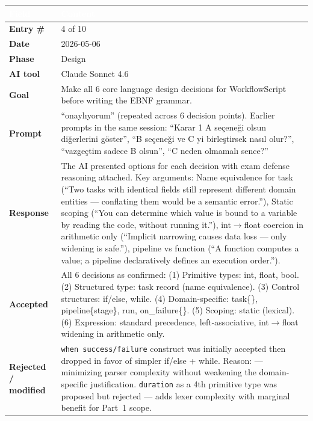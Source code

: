 \documentclass[a4paper,10pt]{article}
\begin{document}
\begin{tabular}{|
    >{\bfseries}m{3.5cm}|
    m{10cm}|
}
\hline
\rowcolor{headerblue}
\textcolor{white}{Field} & \textcolor{white}{\textbf{Content}} \\
\hline
\rowcolor{white}
Entry \#        & 4 of 10 \\
\hline
\rowcolor{altrow}
Date            & 2026-05-06 \\
\hline
\rowcolor{white}
Phase           & Design \\
\hline
\rowcolor{altrow}
AI tool         & Claude Sonnet 4.6  \\
\hline
\rowcolor{white}
Goal            & Make all 6 core language design decisions for WorkflowScript before writing the EBNF grammar. \\
\hline
\rowcolor{altrow}
Prompt          & ``onaylıyorum'' (repeated across 6 decision points). Earlier prompts in the same session: ``Karar 1 A seçeneği olsun diğerlerini göster'', ``B seçeneği ve C yi birleştirsek nasıl olur?'', ``vazgeçtim sadece B olsun'', ``C neden olmamalı sence?'' \\
\hline
\rowcolor{white}
Response & The AI presented options for each decision with exam defense reasoning attached. Key arguments: Name equivalence for task (``Two tasks with identical fields still represent different domain entities --- conflating them would be a semantic error.''), Static scoping (``You can determine which value is bound to a variable by reading the code, without running it.''), int$\rightarrow$float coercion in arithmetic only (``Implicit narrowing causes data loss --- only widening is safe.''), pipeline vs function (``A function computes a value; a pipeline declaratively defines an execution order.''). \\
\hline
\rowcolor{altrow}
Accepted        & All 6 decisions as confirmed: (1) Primitive types: int, float, bool. (2) Structured type: task record (name equivalence). (3) Control structures: if/else, while. (4) Domain-specific: task\{\}, pipeline\{stage\}, run, on\_failure\{\}. (5) Scoping: static (lexical). (6) Expression: standard precedence, left-associative, int$\rightarrow$float widening in arithmetic only. \\
\hline
\rowcolor{white}
Rejected / modified & \texttt{when success/failure} construct was initially accepted then dropped in favor of simpler if/else + while. Reason: --- minimizing parser complexity without weakening the domain-specific justification. \texttt{duration} as a 4th primitive type was proposed but rejected --- adds lexer complexity with marginal benefit for Part~1 scope. \\

\end{tabular}
\end{document}
